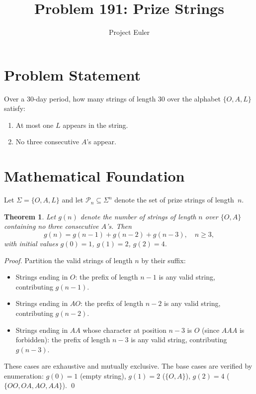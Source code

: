 \documentclass[12pt]{article}
\title{Problem 191: Prize Strings}
\author{Project Euler}
\date{}
\newtheorem{theorem}{Theorem}
\begin{document}
\maketitle

\section{Problem Statement}

Over a 30-day period, how many strings of length 30 over the alphabet $\{O, A, L\}$ satisfy:
\begin{enumerate}
    \item At most one $L$ appears in the string.
    \item No three consecutive $A$'s appear.
\end{enumerate}

\section{Mathematical Foundation}

Let $\Sigma = \{O, A, L\}$ and let $\mathcal{P}_n \subseteq \Sigma^n$ denote the set of prize strings of length~$n$.

\begin{theorem}
Let $g(n)$ denote the number of strings of length $n$ over $\{O, A\}$ containing no three consecutive $A$'s. Then
\[
    g(n) = g(n-1) + g(n-2) + g(n-3), \quad n \ge 3,
\]
with initial values $g(0) = 1$, $g(1) = 2$, $g(2) = 4$.
\end{theorem}

\begin{proof}
Partition the valid strings of length $n$ by their suffix:
\begin{itemize}
    \item Strings ending in $O$: the prefix of length $n-1$ is any valid string, contributing $g(n-1)$.
    \item Strings ending in $AO$: the prefix of length $n-2$ is any valid string, contributing $g(n-2)$.
    \item Strings ending in $AA$ whose character at position $n-3$ is $O$ (since $AAA$ is forbidden): the prefix of length $n-3$ is any valid string, contributing $g(n-3)$.
\end{itemize}
These cases are exhaustive and mutually exclusive. The base cases are verified by enumeration: $g(0) = 1$ (empty string), $g(1) = 2$ ($\{O, A\}$), $g(2) = 4$ ($\{OO, OA, AO, AA\}$). \qed
\end{proof}
\end{document}
